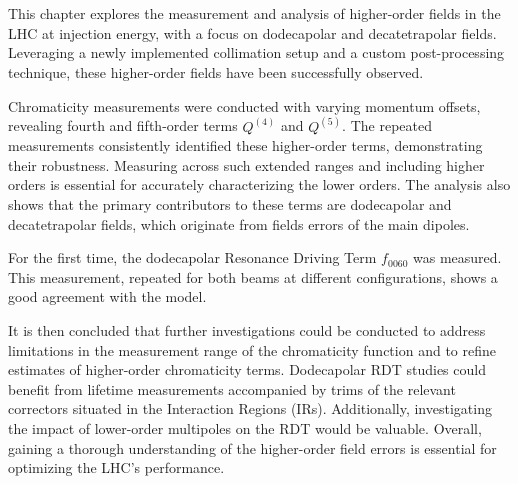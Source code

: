 











\section{}

This chapter explores the measurement and analysis of higher-order fields in the LHC at injection 
energy, with a focus on dodecapolar and decatetrapolar fields. Leveraging a newly implemented
collimation setup and a custom post-processing technique, these higher-order fields have been
successfully observed.

Chromaticity measurements were conducted with varying momentum offsets, revealing fourth and
fifth-order terms $Q^{(4)}$ and $Q^{(5)}$. The repeated measurements consistently identified these
higher-order terms, demonstrating their robustness. Measuring across such extended ranges and
including higher orders is essential for accurately characterizing the lower orders. The analysis
also shows that the primary contributors to these terms are dodecapolar and decatetrapolar fields,
which originate from fields errors of the main dipoles.

For the first time, the dodecapolar Resonance Driving Term $f_{0060}$ was measured. This
measurement, repeated for both beams at different configurations, shows a good agreement with the
model.

It is then concluded that further investigations could be conducted to address limitations in the
measurement range of the chromaticity function and to refine estimates of higher-order chromaticity
terms. Dodecapolar RDT studies could benefit from lifetime measurements accompanied by trims of
the relevant correctors situated in the Interaction Regions (IRs). Additionally, investigating the 
impact of lower-order multipoles on the RDT would be valuable.
Overall, gaining a thorough understanding of the higher-order field errors is essential for
optimizing the LHC's performance.